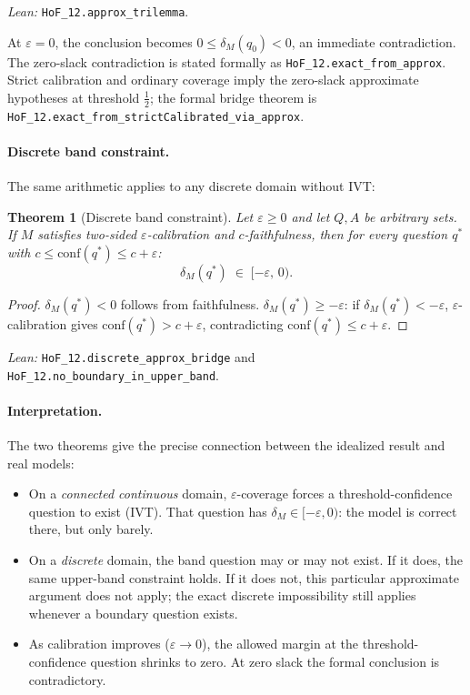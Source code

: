 \documentclass[10pt]{article}
\newtheorem{theorem}{Theorem}[section]
\newcommand{\conf}{\mathrm{conf}}
\begin{document}
\noindent\emph{Lean:} \texttt{HoF\_12.approx\_trilemma}.

At $\varepsilon = 0$, the conclusion becomes
$0 \leq \delta_M(q_0) < 0$, an immediate contradiction. The zero-slack
contradiction is stated formally as \texttt{HoF\_12.exact\_from\_approx}.
Strict calibration and ordinary coverage imply the zero-slack approximate
hypotheses at threshold $\tfrac{1}{2}$; the formal bridge theorem is
\texttt{HoF\_12.exact\_from\_strictCalibrated\_via\_approx}.

\paragraph{Discrete band constraint.}
The same arithmetic applies to any discrete domain without IVT:

\begin{theorem}[Discrete band constraint]
\label{thm:discrete-band}
Let $\varepsilon \geq 0$ and let $Q, A$ be arbitrary sets. If $M$ satisfies
two-sided $\varepsilon$-calibration
and $c$-faithfulness, then for every question $q^*$ with $c \leq \conf(q^*) \leq
c + \varepsilon$:
\[
  \delta_M(q^*) \;\in\; [-\varepsilon,\, 0).
\]
\end{theorem}

\begin{proof}
$\delta_M(q^*) < 0$ follows from faithfulness. $\delta_M(q^*) \geq -\varepsilon$:
if $\delta_M(q^*) < -\varepsilon$, $\varepsilon$-calibration gives $\conf(q^*) > c+\varepsilon$,
contradicting $\conf(q^*) \leq c+\varepsilon$.
\end{proof}

\noindent\emph{Lean:} \texttt{HoF\_12.discrete\_approx\_bridge} and
\texttt{HoF\_12.no\_boundary\_in\_upper\_band}.

\paragraph{Interpretation.}
The two theorems give the precise connection between the idealized result and
real models:

\begin{itemize}[nosep]
\item On a \emph{connected continuous} domain, $\varepsilon$-coverage forces a
  threshold-confidence question to exist (IVT). That question has
  $\delta_M \in [-\varepsilon, 0)$: the model is correct there, but only barely.
\item On a \emph{discrete} domain, the band question may or may not exist. If it
  does, the same upper-band constraint holds. If it does not, this particular
  approximate argument does not apply; the exact discrete impossibility still
  applies whenever a boundary question exists.
\item As calibration improves ($\varepsilon \to 0$), the allowed margin at the
  threshold-confidence question shrinks to zero. At zero slack the formal
  conclusion is contradictory.
\end{itemize}
\end{document}
